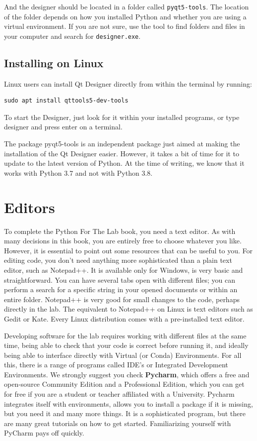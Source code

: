 \sloppy And the designer should be located in a folder called \texttt{pyqt5-tools}. The location of the folder depends on how you installed Python and whether you are using a virtual environment. If you are not sure, use the tool to find folders and files in your computer and search for \texttt{designer.exe}.

\subsection{Installing on Linux}\label{subsec:installing-on-linux}
Linux users can install Qt Designer directly from within the terminal by running:

\begin{verbatim}
sudo apt install qttools5-dev-tools
\end{verbatim}

To start the Designer, just look for it within your installed programs, or type designer and press enter on a terminal.

The package pyqt5-tools is an independent package just aimed at making the installation of the Qt Designer easier. However, it takes a bit of time for it to update to the latest version of Python. At the time of writing, we know that it works with Python 3.7 and not with Python 3.8.

\section{Editors}\label{sec:editors}
To complete the Python For The Lab book, you need a text editor. As with many decisions in this book, you are entirely free to choose whatever you like. However, it is essential to point out some resources that can be useful to you. For editing code, you don't need anything more sophisticated than a plain text editor, such as Notepad++. It is available only for Windows, is very basic and straightforward. You can have several tabs open with different files; you can perform a search for a specific string in your opened documents or within an entire folder. Notepad++ is very good for small changes to the code, perhaps directly in the lab. The equivalent to Notepad++ on Linux is text editors such as Gedit or Kate. Every Linux distribution comes with a pre-installed text editor.

Developing software for the lab requires working with different files at the same time, being able to check that your code is correct before running it, and ideally being able to interface directly with Virtual (or Conda) Environments. For all this, there is a range of programs called IDE's or Integrated Development Environments. We strongly suggest you check \textbf{Pycharm}, which offers a free and open-source Community Edition and a Professional Edition, which you can get for free if you are a student or teacher affiliated with a University. Pycharm integrates itself with environments, allows you to install a package if it is missing, but you need it and many more things. It is a sophisticated program, but there are many great tutorials on how to get started. Familiarizing yourself with PyCharm pays off quickly.

